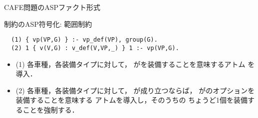 \documentclass[dvipdfmx, 11pt]{beamer}
\begin{document}
\begin{frame}{CAFE問題のASPファクト形式}
  \begin{multicols}{2}
    \scriptsize
    
  \end{multicols}
\end{frame}
\begin{frame}[fragile]{制約のASP符号化: 範囲制約}
 \begin{center} 
 \end{center}

\vfill
\begin{exampleblock}{}
\begin{lstlisting}
  (1) { vp(VP,G) } :- vp_def(VP), group(G). 
  (2) 1 { v(V,G) : v_def(V,VP,_) } 1 :- vp(VP,G).
\end{lstlisting}
\end{exampleblock}
\vfill
\begin{itemize}
\item (1)
  各車種，各装備タイプに対して，
  がを装備することを意味するアトム
  を導入．
\item (2)
  各車種，各装備タイプに対して，
  が成り立つならば，
  がのオプションを装備することを意味する
  アトムを導入し，そのうちの
  ちょうど1個を装備することを強制する．
\end{itemize}
\end{frame}
\end{document}
